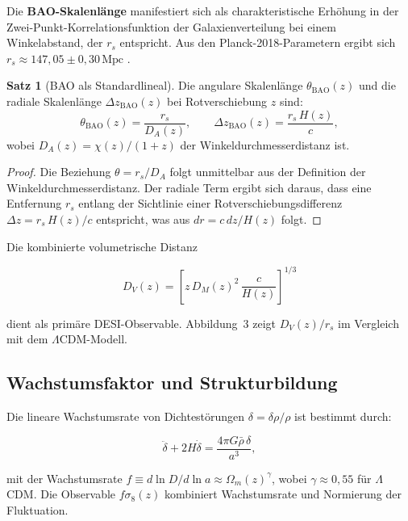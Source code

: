 ﻿\documentclass[a4paper,12pt]{article}
\theoremstyle{definition}
\newtheorem{satz}{Satz}[section]
\theoremstyle{remark}
\begin{document}
Die \textbf{BAO-Skalenlänge} manifestiert sich als charakteristische Erhöhung
in der Zwei-Punkt-Korrelationsfunktion der Galaxienverteilung bei einem
Winkelabstand, der $r_s$ entspricht. Aus den Planck-2018-Parametern ergibt sich
$r_s \approx 147{,}05 \pm 0{,}30\,\text{Mpc}$ \cite{planck2018}.

\begin{satz}[BAO als Standardlineal]
  Die angulare Skalenlänge $\theta_\mathrm{BAO}(z)$ und die radiale
  Skalenlänge $\Delta z_\mathrm{BAO}(z)$ bei Rotverschiebung $z$ sind:
  \begin{equation}
    \label{eq:bao_angular}
    \theta_\mathrm{BAO}(z) = \frac{r_s}{D_A(z)}, \qquad
    \Delta z_\mathrm{BAO}(z) = \frac{r_s\,H(z)}{c},
  \end{equation}
  wobei $D_A(z) = \chi(z)/(1+z)$ der Winkeldurchmesserdistanz ist.
\end{satz}

\begin{proof}
  Die Beziehung $\theta = r_s/D_A$ folgt unmittelbar aus der Definition der
  Winkeldurchmesserdistanz. Der radiale Term ergibt sich daraus, dass eine
  Entfernung $r_s$ entlang der Sichtlinie einer Rotverschiebungsdifferenz
  $\Delta z = r_s\,H(z)/c$ entspricht, was aus $dr = c\,dz/H(z)$ folgt.
\end{proof}

Die kombinierte volumetrische Distanz

\begin{equation}
  \label{eq:DV}
  D_V(z) = \left[z\,D_M(z)^2\,\frac{c}{H(z)}\right]^{1/3}
\end{equation}

dient als primäre DESI-Observable. Abbildung~3 zeigt $D_V(z)/r_s$ im Vergleich
mit dem $\Lambda$CDM-Modell.

\subsection{Wachstumsfaktor und Strukturbildung}

Die lineare Wachstumsrate von Dichtestörungen $\delta = \delta\rho/\rho$ ist
bestimmt durch:

\begin{equation}
  \label{eq:growth}
  \ddot{\delta} + 2H\dot{\delta} = \frac{4\pi G\bar\rho\,\delta}{a^3},
\end{equation}

mit der Wachstumsrate $f \equiv d\ln D/d\ln a \approx \Omega_m(z)^\gamma$,
wobei $\gamma \approx 0{,}55$ für $\Lambda$CDM. Die Observable $f\sigma_8(z)$
kombiniert Wachstumsrate und Normierung der Fluktuation.
\end{document}
